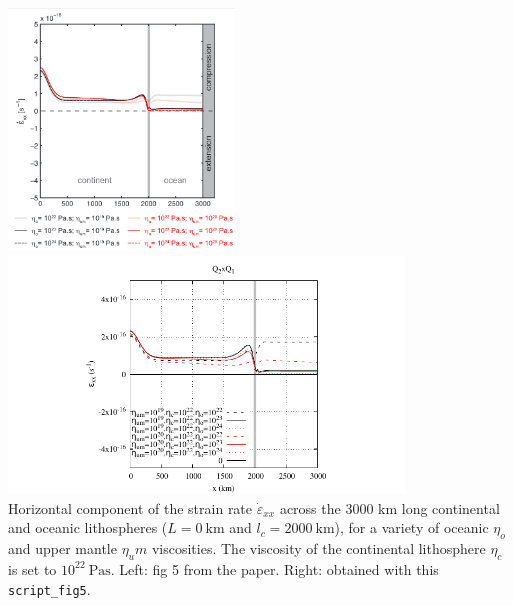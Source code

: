 \begin{center}
\includegraphics[width=6cm]{python_codes/fieldstone_143/images/fig5}
\includegraphics[width=10.5cm]{python_codes/fieldstone_143/results/fig5/fig5a}\\
{\captionfont Horizontal component of the strain rate $\dot{\varepsilon}_{xx}$
across the 3000 km long continental and oceanic lithospheres
($L = 0~\si{\km}$ and $l_c = 2000~\si{\km}$), for a variety of
oceanic $\eta_o$ and upper mantle $\eta_um$ viscosities. The viscosity
of the continental lithosphere $\eta_c$ is set to $10^{22}~\si{\pascal\second}$.
Left: fig 5 from the paper. Right: obtained with this  {\tt script\_fig5}.}
\end{center}

